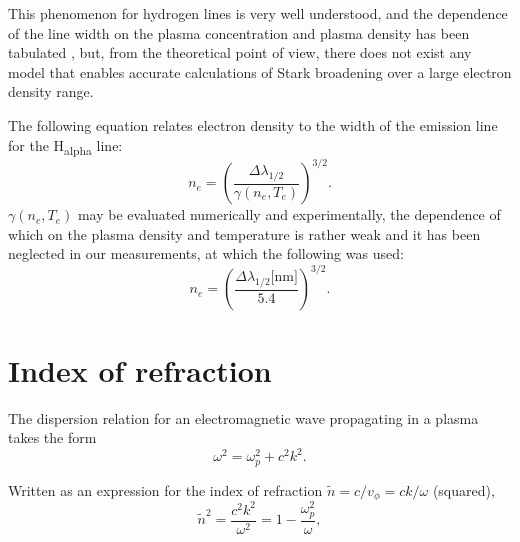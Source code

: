 \documentclass[justified,nofonts,nobib]{tufte-book}
\begin{document}
This phenomenon for hydrogen lines is very well understood, and the dependence of the line width on the plasma concentration and plasma density has been tabulated \cite{Griem1964,Griem1974}, but, from the theoretical point of view, there does not exist any model that enables accurate calculations of Stark broadening over a large electron density range\cite{Griem2000}. 

The following equation relates electron density to the width of the emission line for the H\textsubscript{alpha} line:
\begin{equation}
n_e=\left( \frac{\Delta\lambda_{1/2}}{\gamma\left(n_e,T_e\right)}\right)^{3/2}.
\end{equation}
$\gamma\left(n_e,T_e\right)$ may be evaluated numerically and experimentally\cite{Griem2005}, the dependence of which on the plasma density and temperature is rather weak and it has been neglected in our measurements, at which the following was used:
\begin{equation}
n_e=\left( \frac{\Delta\lambda_{1/2}\text{[nm]}}{5.4}\right)^{3/2}. \label{eq:delta_lambda}
\end{equation}
\section{Index of refraction}\label{sec:indexrefraction}

The dispersion relation \cite{Chen1984} for an electromagnetic wave propagating in a plasma takes the form
\begin{equation}
\omega^2=\omega_p^2+c^2 k^2.
\end{equation}

Written as an expression for the index of refraction $\tilde{n}=c/v_\phi = ck/\omega$ (squared),
\begin{equation}
\tilde{n}^2=\frac{c^2 k^2}{\omega^2}=1-\frac{\omega_p^2}{\omega}, \label{eq:index_of_refraction}
\end{equation}
\end{document}
